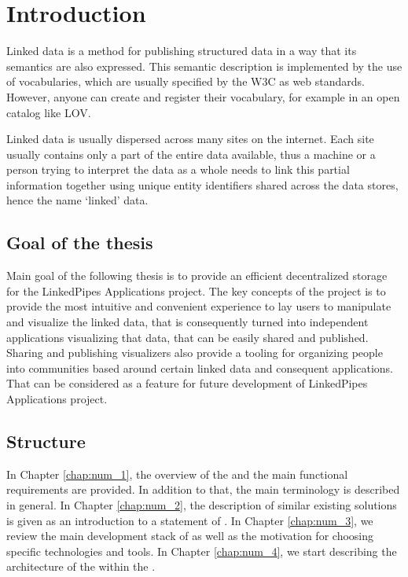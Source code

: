 \chapter*{Introduction}


Linked data is a method for publishing structured data in a way that its semantics are also expressed. This semantic description is implemented by the use of vocabularies, which are usually specified by the \acrshort{W3C} as web standards. However, anyone can create and register their vocabulary, for example in an open catalog like \acrshort{LOV}.

Linked data is usually dispersed across many sites on the internet. Each site usually contains only a part of the entire data available, thus a machine or a person trying to interpret the data as a whole needs to link this partial information together using unique entity identifiers shared across the data stores, hence the name `linked' data.


 
\section*{Goal of the thesis}
Main goal of the following thesis is to provide an efficient decentralized storage for the LinkedPipes Applications project. The key concepts of the project is to provide the most intuitive and convenient experience to lay users to manipulate and visualize the linked data, that is consequently turned into independent applications visualizing that data, that can be easily shared and published. Sharing and publishing visualizers also provide a tooling for organizing people into communities based around certain linked data and consequent applications. That can be considered as a feature for future development of LinkedPipes Applications project. 

\section*{Structure}

In Chapter \ref{chap:num_1}, the overview of the \lpa{} and the main functional requirements are provided. In addition to that, the main terminology is described in general. In Chapter \ref{chap:num_2}, the description of similar existing solutions is given as an introduction to a statement of \lpas{}. In Chapter \ref{chap:num_3}, we review the main development stack of \lpas{} as well as the motivation for choosing specific technologies and tools. In Chapter \ref{chap:num_4}, we start describing the architecture of the \lpas{} within the \lpa{}.